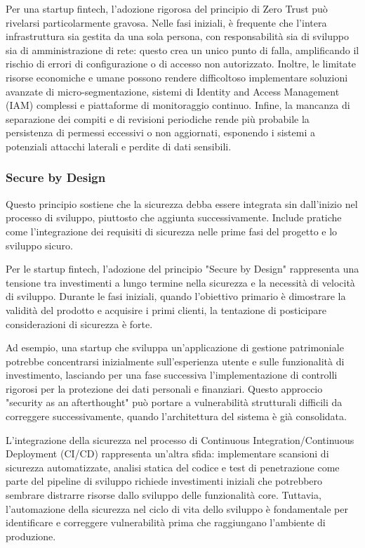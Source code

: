 \documentclass[a4paper,12pt]{report}
\begin{document}
Per una startup fintech, l’adozione rigorosa del principio di Zero Trust può rivelarsi particolarmente gravosa. Nelle fasi iniziali, è frequente che l’intera infrastruttura sia gestita da una sola persona, con responsabilità sia di sviluppo sia di amministrazione di rete: questo crea un unico punto di falla, amplificando il rischio di errori di configurazione o di accesso non autorizzato. Inoltre, le limitate risorse economiche e umane possono rendere difficoltoso implementare soluzioni avanzate di micro-segmentazione, sistemi di Identity and Access Management (IAM) complessi e piattaforme di monitoraggio continuo. Infine, la mancanza di separazione dei compiti e di revisioni periodiche rende più probabile la persistenza di permessi eccessivi o non aggiornati, esponendo i sistemi a potenziali attacchi laterali e perdite di dati sensibili.  


\subsubsection{Secure by Design}
Questo principio sostiene che la sicurezza debba essere integrata sin dall'inizio nel processo di sviluppo, piuttosto che aggiunta successivamente. Include pratiche come l'integrazione dei requisiti di sicurezza nelle prime fasi del progetto e lo sviluppo sicuro.

Per le startup fintech, l'adozione del principio "Secure by Design" rappresenta una tensione tra investimenti a lungo termine nella sicurezza e la necessità di velocità di sviluppo. Durante le fasi iniziali, quando l'obiettivo primario è dimostrare la validità del prodotto e acquisire i primi clienti, la tentazione di posticipare considerazioni di sicurezza è forte.

Ad esempio, una startup che sviluppa un'applicazione di gestione patrimoniale potrebbe concentrarsi inizialmente sull'esperienza utente e sulle funzionalità di investimento, lasciando per una fase successiva l'implementazione di controlli rigorosi per la protezione dei dati personali e finanziari. Questo approccio "security as an afterthought" può portare a vulnerabilità strutturali difficili da correggere successivamente, quando l'architettura del sistema è già consolidata.

L'integrazione della sicurezza nel processo di Continuous Integration/Continuous Deployment (CI/CD) rappresenta un'altra sfida: implementare scansioni di sicurezza automatizzate, analisi statica del codice e test di penetrazione come parte del pipeline di sviluppo richiede investimenti iniziali che potrebbero sembrare distrarre risorse dallo sviluppo delle funzionalità core. Tuttavia, l'automazione della sicurezza nel ciclo di vita dello sviluppo è fondamentale per identificare e correggere vulnerabilità prima che raggiungano l'ambiente di produzione.
\end{document}
